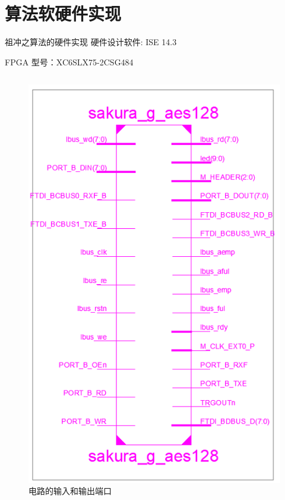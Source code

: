 \documentclass{beamer}
\begin{document}
\section{算法软硬件实现}

\begin{frame}{祖冲之算法的硬件实现}
硬件设计软件: ISE 14.3

FPGA 型号：XC6SLX75-2CSG484

\begin{columns}
    \begin{column}{0.4\textwidth}
        \begin{figure}[htbp]
            \includegraphics[height=0.6\textheight]{./images/circuit_io.png}
            \caption*{电路的输入和输出端口}
        \end{figure}

\end{column}
\end{columns}
\end{frame}
\end{document}
